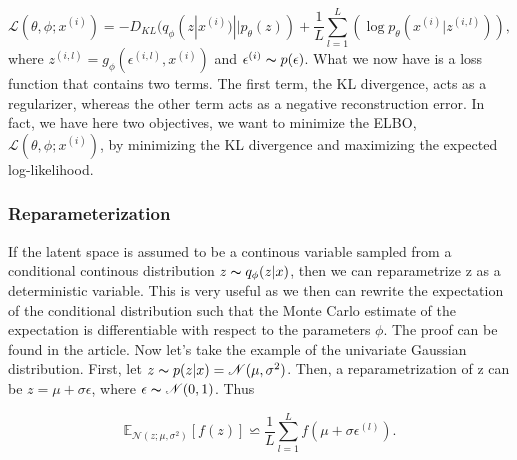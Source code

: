\begin{equation}
    \mathcal{L}(\theta, \phi; x^{(i)}) = -D_{KL}(q_{\phi}(z|x^{(i)})||p_{\theta}(z)) + \frac{1}{L}\sum_{l=1}^{L} (\log p_{\theta}(x^{(i)}|z^{(i,l)})),
\end{equation}
where $z^{(i,l)} = g_{\phi}(\epsilon^{(i,l)}, x^{(i)})$ and $\epsilon^{(i)} \thicksim p(\epsilon)$. What we now have is a loss function that contains two terms. 
The first term, the KL divergence, acts as a regularizer, whereas the other term acts as a negative reconstruction error. In fact, we have here two objectives, 
we want to minimize the ELBO, $\mathcal{L}(\theta, \phi; x^{(i)})$, by minimizing the KL divergence and maximizing the expected log-likelihood. 

\subsubsection*{Reparameterization}\label{sec:reparameterization}
If the latent space is assumed to be a continous variable sampled from a conditional continous distribution 
$z \thicksim q_{\phi}(z|x)$, then we can reparametrize z as a deterministic variable. This is very useful as 
we then can rewrite the expectation of the conditional distribution such that the Monte Carlo estimate of 
the expectation is differentiable with respect to the parameters $\phi$. The proof can be found in the article\cite{VAE}.  
Now let's take the example of the univariate Gaussian distribution. First, let $z \thicksim p(z|x) = \mathcal{N}(\mu, \sigma^2)$. 
Then, a reparametrization of z can be $z = \mu + \sigma\epsilon$, where $\epsilon \thicksim \mathcal{N}(0,1)$. 
Thus 

\begin{equation*}
    \mathbb{E}_{\mathcal{N}(z; \mu, \sigma^2)}[f(z)] \backsimeq  \frac{1}{L}\sum_{l=1}^L f(\mu + \sigma\epsilon^{(l)}).
\end{equation*}

